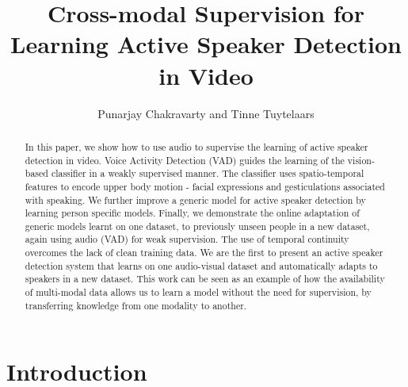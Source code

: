 \documentclass[runningheads]{llncs}
\begin{document}
\pagestyle{headings}
\mainmatter

\title{Cross-modal Supervision for Learning Active Speaker Detection in Video}




\author{Punarjay Chakravarty and Tinne Tuytelaars}


\maketitle

\begin{abstract}
In this paper, we show how to use audio to supervise the learning of active speaker detection in video. Voice Activity Detection (VAD) guides the learning of the vision-based classifier in a weakly supervised manner. The classifier uses spatio-temporal features to encode upper body motion - facial expressions and gesticulations associated with speaking. We further improve a generic model for active speaker detection by learning person specific models. Finally, we demonstrate the online adaptation of generic models learnt on one dataset, to previously unseen people in a new dataset, again using audio (VAD) for weak supervision. The use of temporal continuity overcomes the lack of clean training data. We are the first to present an %
active speaker detection system that learns on one audio-visual dataset and automatically adapts to speakers in a new dataset. This work can be seen as an example of how the availability of multi-modal data allows us to learn a model without the need for supervision, by transferring knowledge from one modality to another.
\end{abstract}


\section{Introduction}
\end{document}
